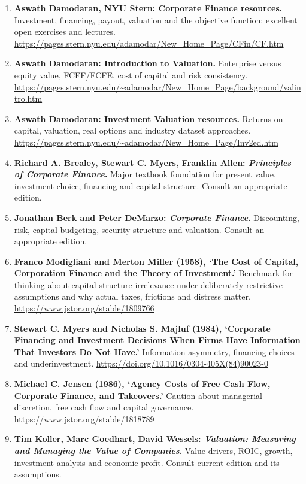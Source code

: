 \begin{enumerate}
    \item \textbf{Aswath Damodaran, NYU Stern: Corporate Finance resources.} Investment, financing, payout, valuation and the objective function; excellent open exercises and lectures. \url{https://pages.stern.nyu.edu/adamodar/New_Home_Page/CFin/CF.htm}
    \item \textbf{Aswath Damodaran: Introduction to Valuation.} Enterprise versus equity value, FCFF/FCFE, cost of capital and risk consistency. \url{https://pages.stern.nyu.edu/~adamodar/New_Home_Page/background/valintro.htm}
    \item \textbf{Aswath Damodaran: Investment Valuation resources.} Returns on capital, valuation, real options and industry dataset approaches. \url{https://pages.stern.nyu.edu/~adamodar/New_Home_Page/Inv2ed.htm}
    \item \textbf{Richard A. Brealey, Stewart C. Myers, Franklin Allen: \textit{Principles of Corporate Finance}.} Major textbook foundation for present value, investment choice, financing and capital structure. Consult an appropriate edition.
    \item \textbf{Jonathan Berk and Peter DeMarzo: \textit{Corporate Finance}.} Discounting, risk, capital budgeting, security structure and valuation. Consult an appropriate edition.
    \item \textbf{Franco Modigliani and Merton Miller (1958), `The Cost of Capital, Corporation Finance and the Theory of Investment.'} Benchmark for thinking about capital-structure irrelevance under deliberately restrictive assumptions and why actual taxes, frictions and distress matter. \url{https://www.jstor.org/stable/1809766}
    \item \textbf{Stewart C. Myers and Nicholas S. Majluf (1984), `Corporate Financing and Investment Decisions When Firms Have Information That Investors Do Not Have.'} Information asymmetry, financing choices and underinvestment. \url{https://doi.org/10.1016/0304-405X(84)90023-0}
    \item \textbf{Michael C. Jensen (1986), `Agency Costs of Free Cash Flow, Corporate Finance, and Takeovers.'} Caution about managerial discretion, free cash flow and capital governance. \url{https://www.jstor.org/stable/1818789}
    \item \textbf{Tim Koller, Marc Goedhart, David Wessels: \textit{Valuation: Measuring and Managing the Value of Companies}.} Value drivers, ROIC, growth, investment analysis and economic profit. Consult current edition and its assumptions.

\end{enumerate}
